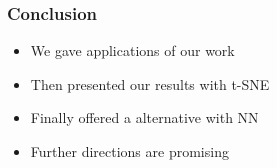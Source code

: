 \documentclass[10pt]{beamer}
\begin{document}
\begin{frame}
    \frametitle{Conclusion}
    \begin{itemize}
        \item We gave applications of our work
        \item Then presented our results with t-SNE
        \item Finally offered a alternative with NN
        \item Further directions are promising
    \end{itemize}
\end{frame}
\end{document}

